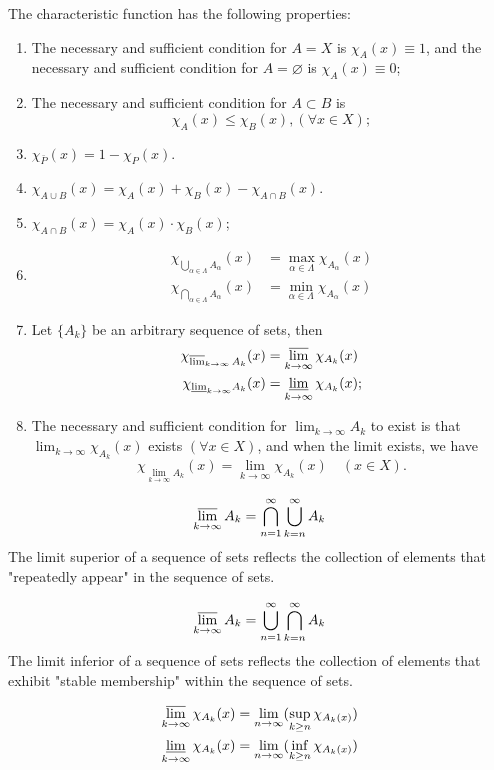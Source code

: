 \documentclass[../main.tex]{subfiles}
\begin{document}
The characteristic function has the following properties:
\begin{enumerate}
    \item The necessary and sufficient condition for $A = X$ is $\chi_A(x)\equiv1$, and the necessary and sufficient condition for $A=\varnothing$ is $\chi_A(x)\equiv0$;
    \item The necessary and sufficient condition for $A\subset B$ is
        $$
        \chi_A(x)\leq\chi_B(x),(\forall x\in X);
        $$

    \item $\chi_{\bar P}(x) = 1 - \chi_{P}(x)$.
    \item $\chi_{A\cup B}(x)=\chi_A(x)+\chi_B(x)-\chi_{A\cap B}(x)$.
    \item $\chi_{A\cap B}(x)=\chi_A(x)\cdot \chi_B(x)$;
    \item \begin{align*}
        \chi_{\bigcup_{\alpha\in\Lambda}A_{\alpha}}(x) &= \max_{\alpha\in\Lambda}\chi_{A_\alpha}(x)\\
        \chi_{\bigcap_{\alpha\in\Lambda}A_{\alpha}}(x) &= \min_{\alpha\in\Lambda}\chi_{A_\alpha}(x)
    \end{align*}
    \item Let $\{A_k\}$ be an arbitrary sequence of sets, then \begin{align*}
        \chi_{\varlimsup_{k \to \infty} A_k}(x)&=\varlimsup_{k \to \infty}\chi_{A_k}(x)\\
        \chi_{\underline{\lim}_{k \to \infty} A_k}(x)&=\varliminf_{k \to \infty}\chi_{A_k}(x);\\
    \end{align*}
    \item The necessary and sufficient condition for $\lim_{k \to \infty} A_k$ to exist is that $\lim_{k \to \infty} \chi_{A_k}(x)$ exists $(\forall x \in X)$, and when the limit exists, we have
    $$
    \chi_{\lim_{k \to \infty} A_k}(x)=\lim_{k \to \infty} \chi_{A_k}(x)\quad (x \in X).
    $$
\end{enumerate}

\begin{green}

$$
\varlimsup_{k\to \infty}A_k = \bigcap_{n=1}^{\infty}\bigcup_{k=n}^{\infty}A_k
$$
The limit superior of a sequence of sets reflects the collection of elements that "repeatedly appear" in the sequence of sets.

$$
\varlimsup_{k\to \infty}A_k = \bigcup_{n=1}^{\infty}\bigcap_{k=n}^{\infty}A_k
$$
The limit inferior of a sequence of sets reflects the collection of elements that exhibit "stable membership" within the sequence of sets.

\begin{align*}
\varlimsup_{k\to\infty}\chi_{A_k}(x)&=\lim_{n\to\infty}(\sup_{k\ge n}\chi_{A_k(x)})\\
\varliminf_{k\to\infty}\chi_{A_k}(x)&=\lim_{n\to\infty}(\inf_{k\ge n}\chi_{A_k(x)})
\end{align*}
\end{green}
\end{document}
